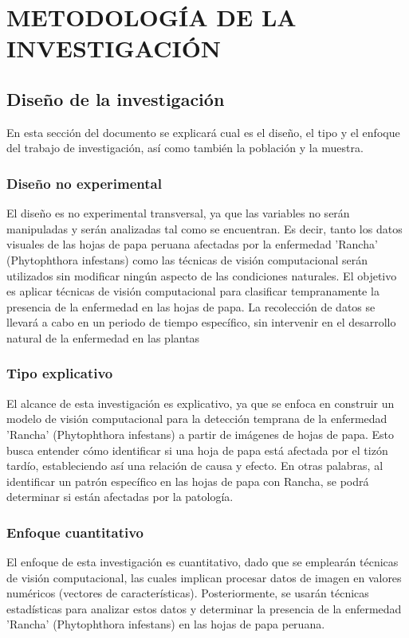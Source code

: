 \chapter{METODOLOGÍA DE LA INVESTIGACIÓN}
\section{Diseño de la investigación}
En esta sección del documento se explicará cual es el diseño, el tipo y el enfoque del trabajo de
investigación, así como también la población y la muestra. 
\subsection{Diseño no experimental}
El diseño es no experimental transversal, ya que las variables no serán manipuladas y serán analizadas tal como se encuentran. Es decir, tanto los datos visuales de las hojas de papa peruana afectadas por la enfermedad 'Rancha' (Phytophthora infestans) como las técnicas de visión computacional serán utilizados sin modificar ningún aspecto de las condiciones naturales. El objetivo es aplicar técnicas de visión computacional para clasificar tempranamente la presencia de la enfermedad en las hojas de papa. La recolección de datos se llevará a cabo en un periodo de tiempo específico, sin intervenir en el desarrollo natural de la enfermedad en las plantas

\subsection{Tipo explicativo}
El alcance de esta investigación es explicativo, ya que se enfoca en construir un modelo de visión computacional para la detección temprana de la enfermedad 'Rancha' (Phytophthora infestans) a partir de imágenes de hojas de papa. Esto busca entender cómo identificar si una hoja de papa está afectada por el tizón tardío, estableciendo así una relación de causa y efecto. En otras palabras, al identificar un patrón específico en las hojas de papa con Rancha, se podrá determinar si están afectadas por la patología.

\subsection{Enfoque cuantitativo}
El enfoque de esta investigación es cuantitativo, dado que se emplearán técnicas de visión computacional, las cuales implican procesar datos de imagen en valores numéricos (vectores de características). Posteriormente, se usarán técnicas estadísticas para analizar estos datos y determinar la presencia de la enfermedad 'Rancha' (Phytophthora infestans) en las hojas de papa peruana.

